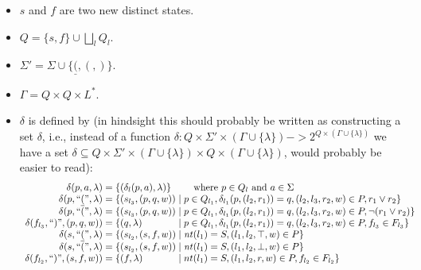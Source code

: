 \documentclass[acmsmall,review,anonymous]{acmart}\settopmatter{printfolios=true,printccs=false,printacmref=false}
\newcommand{\T}{\Sigma} %
\newcommand{\Labels}{L} %
\newcommand{\reqpl}{\underline{(}}
\newcommand{\reqpr}{)}
\newcommand{\pospl}{(}
\newcommand{\pospr}{)}
\newcommand{\labelnt}{\mathit{nt}} %
\begin{document}
\begin{itemize}
\item $s$ and $f$ are two new distinct states.
\item $Q = \{s, f\} \cup \bigsqcup_l Q_l$.
\item $\T' = \T \cup \{\reqpl, \pospl, \pospr\}$.
\item $\Gamma = Q \times Q \times \Labels^{*}$.
\item $\delta$ is defined by (in hindsight this should probably be written as constructing a set $\delta$, i.e., instead of a function $\delta: Q \times \T' \times (\Gamma \cup \{\lambda\}) -> 2^{Q \times (\Gamma \cup \{\lambda\})}$ we have a set $\delta \subseteq Q \times \T' \times (\Gamma \cup \{\lambda\}) \times Q \times (\Gamma \cup \{\lambda\})$, would probably be easier to read):
  $$
  \begin{array}{r@{\;=\;}l@{\;\mid\;}l}
    \delta(p, a, \lambda)
    & \multicolumn{2}{@{}l@{}}{\{(\delta_l(p, a), \lambda)\} \qquad \text{ where } p \in Q_l \text{ and } a \in \T} \\

    \delta(p, \text{``}\reqpl\text{''}, \lambda)
    & \{ (s_{l_3}, (p, q, w))
    & p \in Q_{l_1}, \delta_{l_1}(p, (l_2, r_1)) = q, (l_2, l_3, r_2, w) \in P, r_1 \lor r_2 \} \\

    \delta(p, \text{``}\pospl\text{''}, \lambda)
    & \{ (s_{l_3}, (p, q, w))
    & p \in Q_{l_1}, \delta_{l_1}(p, (l_2, r_1)) = q, (l_2, l_3, r_2, w) \in P, \neg (r_1 \lor r_2) \} \\

    \delta(f_{l_3}, \text{``}\reqpr\text{''}, (p, q, w))
    & \{ (q, \lambda)
    & p \in Q_{l_1}, \delta_{l_1}(p, (l_2, r_1)) = q, (l_2, l_3, r_2, w) \in P, f_{l_3} \in F_{l_3} \} \\

    \delta(s, \text{``}\reqpl\text{''}, \lambda)
    & \{ (s_{l_2}, (s, f, w))
    & \labelnt(l_1) = S, (l_1, l_2, \top, w) \in P \} \\

    \delta(s, \text{``}\pospl\text{''}, \lambda)
    & \{ (s_{l_2}, (s, f, w))
    & \labelnt(l_1) = S, (l_1, l_2, \bot, w) \in P \} \\

    \delta(f_{l_2}, \text{``}\reqpr\text{''}, (s, f, w))
    & \{ (f, \lambda)
    & nt(l_1) = S, (l_1, l_2, r, w) \in P, f_{l_2} \in F_{l_2}\} \\
  \end{array}
  $$
\end{itemize}
\end{document}
